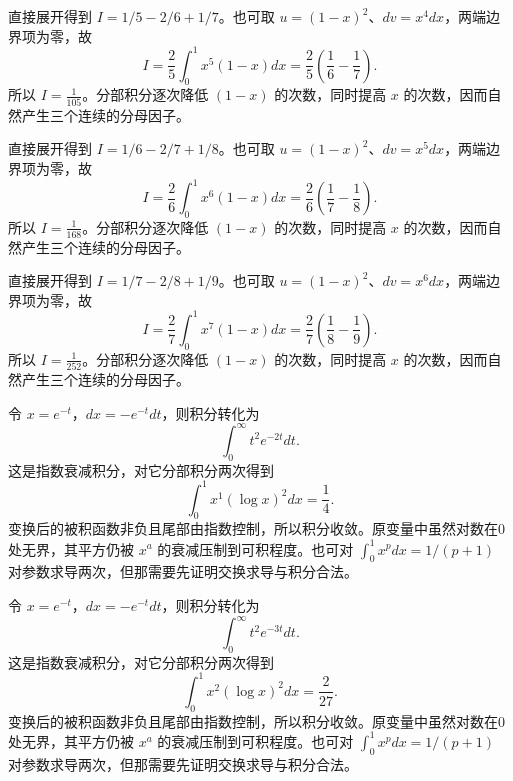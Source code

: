 \documentclass[12pt,fontset=fandol]{ctexart}
\begin{document}
\begin{solve}\label{ans:c20q4}
直接展开得到 $I=1/5-2/6+1/7$。也可取 $u=(1-x)^2$、$dv=x^{4}dx$，两端边界项为零，故
\[
I=\frac2{5}\int_0^1x^{5}(1-x)dx=\frac2{5}\left(\frac1{6}-\frac1{7}\right).
\]
所以 $I=\frac{1}{105}$。分部积分逐次降低 $(1-x)$ 的次数，同时提高 $x$ 的次数，因而自然产生三个连续的分母因子。
\end{solve}

\begin{solve}\label{ans:c20q5}
直接展开得到 $I=1/6-2/7+1/8$。也可取 $u=(1-x)^2$、$dv=x^{5}dx$，两端边界项为零，故
\[
I=\frac2{6}\int_0^1x^{6}(1-x)dx=\frac2{6}\left(\frac1{7}-\frac1{8}\right).
\]
所以 $I=\frac{1}{168}$。分部积分逐次降低 $(1-x)$ 的次数，同时提高 $x$ 的次数，因而自然产生三个连续的分母因子。
\end{solve}

\begin{solve}\label{ans:c20q6}
直接展开得到 $I=1/7-2/8+1/9$。也可取 $u=(1-x)^2$、$dv=x^{6}dx$，两端边界项为零，故
\[
I=\frac2{7}\int_0^1x^{7}(1-x)dx=\frac2{7}\left(\frac1{8}-\frac1{9}\right).
\]
所以 $I=\frac{1}{252}$。分部积分逐次降低 $(1-x)$ 的次数，同时提高 $x$ 的次数，因而自然产生三个连续的分母因子。
\end{solve}

\begin{solve}\label{ans:c20q7}
令 $x=e^{-t}$，$dx=-e^{-t}dt$，则积分转化为
\[
\int_0^\infty t^2e^{-2t}dt.
\]
这是指数衰减积分，对它分部积分两次得到
\[
\int_0^1x^{1}(\log x)^2dx=\frac{1}{4}.
\]
变换后的被积函数非负且尾部由指数控制，所以积分收敛。原变量中虽然对数在0处无界，其平方仍被 $x^a$ 的衰减压制到可积程度。也可对 $\int_0^1x^pdx=1/(p+1)$ 对参数求导两次，但那需要先证明交换求导与积分合法。
\end{solve}

\begin{solve}\label{ans:c20q8}
令 $x=e^{-t}$，$dx=-e^{-t}dt$，则积分转化为
\[
\int_0^\infty t^2e^{-3t}dt.
\]
这是指数衰减积分，对它分部积分两次得到
\[
\int_0^1x^{2}(\log x)^2dx=\frac{2}{27}.
\]
变换后的被积函数非负且尾部由指数控制，所以积分收敛。原变量中虽然对数在0处无界，其平方仍被 $x^a$ 的衰减压制到可积程度。也可对 $\int_0^1x^pdx=1/(p+1)$ 对参数求导两次，但那需要先证明交换求导与积分合法。
\end{solve}
\end{document}

